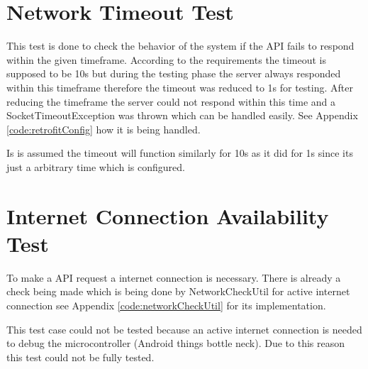 \section{Network Timeout Test}
    This test is done to check the behavior of the system
    if the API fails to respond within the
    given timeframe. According to the requirements
    the timeout is supposed to be 10s but during the testing phase 
    the server always responded within this timeframe therefore the
    timeout was reduced to 1s for testing. After
    reducing the timeframe the server could not respond within this time 
    and a SocketTimeoutException was thrown which can be handled easily. See
    Appendix
    \ref{code:retrofitConfig} how it is being handled. 

    Is is assumed the timeout will function similarly for 10s as it 
    did for 1s since its just a arbitrary
    time which is configured.

\section{Internet Connection Availability Test}
    \label{sec:internetConnectionTest}
    To make a API request a internet connection is necessary. There is 
    already a check being made which is being done by
    NetworkCheckUtil for active internet connection see Appendix
    \ref{code:networkCheckUtil} for its implementation.

    This test case could not be tested because an active internet connection
    is needed to debug the microcontroller (Android things bottle neck). Due to this reason this test could not
    be fully tested.
    